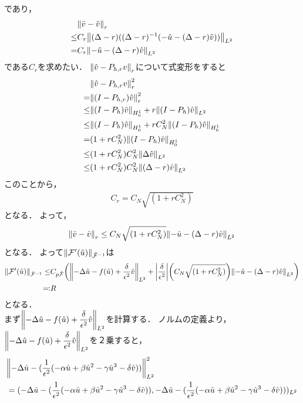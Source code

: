 であり，
\begin{align}
   &\norm{\bar{v}-\hat{v}}_r\\
   \leq&C_r\norm{(\Delta-r)((\Delta-r)^{-1}(-\hat{u}-(\Delta-r)\hat{v}))}_{L^2}\\
   =&C_r\norm{-\hat{u}-(\Delta-r)\hat{v}}_{L^2}
\end{align}
である\(C_r\)を求めたい．
\(\norm{\hat{v}-P_{h,r}v}_r\)について式変形をすると
\begin{align}
   &\norm{\hat{v}-P_{h,r}v}_r^2\\
   =&\norm{(I-P_{h,r})\hat{v}}_r^2\\
   \leq&\norm{(I-P_{h})\hat{v}}_{H^1_0}+r\norm{(I-P_{h})\hat{v}}_{L^2}\\
   \leq&\norm{(I-P_{h})\hat{v}}_{H^1_0}+rC_{N}^2\norm{(I-P_{h})\hat{v}}_{H^1_0}\\
   =&(1+rC_N^2)\norm{(I-P_{h})\hat{v}}_{H^1_0}\\
   \leq&(1+rC_N^2)C_N^2\norm{\Delta\hat{v}}_{L^2}\\
   \leq&(1+rC_N^2)C_N^2\norm{(\Delta-r)\hat{v}}_{L^2}\\
\end{align}
このことから，
\begin{align}
   C_r=C_N\sqrt{(1+rC_N^2)}
\end{align}
となる．
よって，
\begin{align}
   \norm{\bar{v}-\hat{v}}_r
   \leq
   C_N\sqrt{(1+rC_N^2)}\norm{-\hat{u}-(\Delta-r)\hat{v}}_{L^2}
\end{align}
となる．
よって\(\norm{\mathcal{F}'(\hat{u})}_{\tilde{\mathcal{F}}^{-1}}\)は
\begin{align}
   \norm{\mathcal{F}'(\hat{u})}_{\tilde{\mathcal{F}}^{-1}}
   \leq&
   C_{p\tilde{\mathcal{F}}}\qty(\norm{-\Delta \hat{u}-f(\hat{u})+\dfrac{\delta}{\epsilon^2}\hat{v}}_{L^2}+\qty|\dfrac{\delta}{\epsilon^2}|\qty(C_N\sqrt{(1+rC_N^2)})\norm{-\hat{u}-(\Delta-r)\hat{v}}_{L^2})\\
   \eqqcolon & R
\end{align}
となる．\\
まず\(\norm{-\Delta \hat{u}-f(\hat{u})+\dfrac{\delta}{\epsilon^2}\hat{v}}_{L^2}\)を計算する．
ノルムの定義より，\(\norm{-\Delta \hat{u}-f(\hat{u})+\dfrac{\delta}{\epsilon^2}\hat{v}}_{L^2}\)を２乗すると，
\begin{align}
   &\norm{-\Delta \hat{u}-(\dfrac{1}{\epsilon^2}(-\alpha \hat{u} + \beta \hat{u}^2 -\gamma \hat{u}^3-\delta \hat{v}))}_{L^2}^2\\
   &=(-\Delta \hat{u}-(\dfrac{1}{\epsilon^2}(-\alpha \hat{u} + \beta \hat{u}^2 -\gamma \hat{u}^3-\delta \hat{v})),
      -\Delta \hat{u}-(\dfrac{1}{\epsilon^2}(-\alpha \hat{u} + \beta \hat{u}^2 -\gamma \hat{u}^3-\delta \hat{v})))_{L^2}
\end{align}
